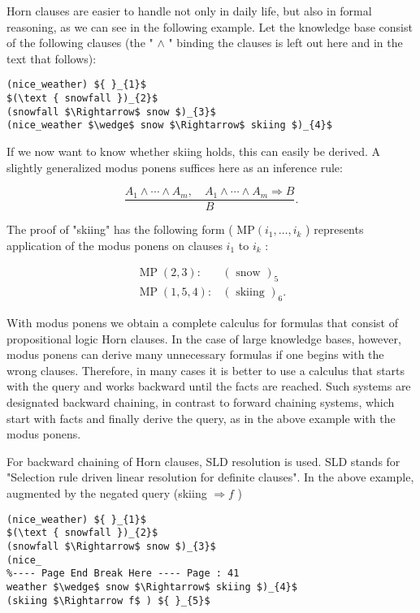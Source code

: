 \documentclass[10pt]{article}
\begin{document}
Horn clauses are easier to handle not only in daily life, but also in formal reasoning, as we can see in the following example. Let the knowledge base consist of the following clauses (the " $\wedge$ " binding the clauses is left out here and in the text that follows):

\begin{verbatim}
(nice_weather) ${ }_{1}$
$(\text { snowfall })_{2}$
(snowfall $\Rightarrow$ snow $)_{3}$
(nice_weather $\wedge$ snow $\Rightarrow$ skiing $)_{4}$
\end{verbatim}

If we now want to know whether skiing holds, this can easily be derived. A slightly generalized modus ponens suffices here as an inference rule:

$$
\frac{A_{1} \wedge \cdots \wedge A_{m}, \quad A_{1} \wedge \cdots \wedge A_{m} \Rightarrow B}{B} .
$$

The proof of "skiing" has the following form ( $\mathrm{MP}\left(i_{1}, \ldots, i_{k}\right.$ ) represents application of the modus ponens on clauses $i_{1}$ to $i_{k}$ :

$$
\begin{array}{ll}
\operatorname{MP}(2,3): & (\text { snow })_{5} \\
\operatorname{MP}(1,5,4): & (\text { skiing })_{6} .
\end{array}
$$

With modus ponens we obtain a complete calculus for formulas that consist of propositional logic Horn clauses. In the case of large knowledge bases, however, modus ponens can derive many unnecessary formulas if one begins with the wrong clauses. Therefore, in many cases it is better to use a calculus that starts with the query and works backward until the facts are reached. Such systems are designated backward chaining, in contrast to forward chaining systems, which start with facts and finally derive the query, as in the above example with the modus ponens.

For backward chaining of Horn clauses, SLD resolution is used. SLD stands for "Selection rule driven linear resolution for definite clauses". In the above example, augmented by the negated query (skiing $\Rightarrow f$ )

\begin{verbatim}
(nice_weather) ${ }_{1}$
$(\text { snowfall })_{2}$
(snowfall $\Rightarrow$ snow $)_{3}$
(nice_
%---- Page End Break Here ---- Page : 41
weather $\wedge$ snow $\Rightarrow$ skiing $)_{4}$
(skiing $\Rightarrow f$ ) ${ }_{5}$
\end{verbatim}
\end{document}
